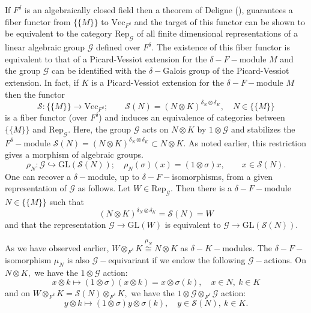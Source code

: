 \documentclass[preprint, 11pt]{amsart}
\theoremstyle{corollary}
\theoremstyle{remark}
\theoremstyle{proposition}
\numberwithin{equation}{subsection}
\begin{document}
If $F^{\delta}$ is an algebraically closed field then a theorem of Deligne (\cite[Section 9]{Del90}), guarantees a fiber functor from $\{\{M\}\}$ to $\mathrm{Vec}_{F^{\delta}}$ and the target of this functor can be shown to be equivalent to the category $\mathrm{Rep}_\mathscr G$ of all finite dimensional representations of a linear algebraic group $\mathscr G$ defined over $F^{\delta}.$ The existence of this fiber functor is equivalent to that of a Picard-Vessiot extension for the $\delta-F-$module $M$ and the group $\mathscr G$ can be identified with the $\delta-$Galois group of the Picard-Vessiot extension.  In fact, if $K$ is a  Picard-Vessiot extension  for the $\delta-F-$module $M$ then the functor $$\mathscr S: \{\{M\}\}\to \mathrm{Vec}_{F^{\delta}};\qquad \mathscr S(N)=(N\otimes K)^{\delta_N\otimes \delta_K}, \quad N\in \{\{M\}\}$$ is a fiber functor (over $F^{\delta}$) and induces an equivalence of categories between $\{\{M\}\}$ and  $\mathrm{Rep}_\mathscr G.$  Here, the group $\mathscr G$ acts on $N\otimes K$ by $1\otimes \mathscr G$ and  stabilizes the $F^{\delta}-$module  $\mathscr S(N)=(N\otimes K)^{\delta_N\otimes \delta_K}\subset N\otimes K.$  As noted earlier,  this restriction gives a morphism of algebraic groups. 
  \begin{equation*}\label{groupaction} \rho_N: \mathscr{G}\hookrightarrow\mathrm{GL}(\mathscr S (N));\quad  \rho_N(\sigma)(x)=(1\otimes\sigma)x,
	\qquad x\in \mathscr S(N).\end{equation*} 
 One can recover a $\delta-$module, up to $\delta-F-$isomorphisms,  from a given representation of $\mathscr{G}$ as follows. Let $W\in \mathrm{Rep}_\mathscr G.$ Then there is a $\delta-F-$module $N\in \{\{M\}\}$ such that $$(N\otimes K)^{\delta_N\otimes\delta_K}=\mathscr S(N)=W$$ and that the representation $\mathscr G\to \mathrm{GL}(W)$ is equivalent to $\mathscr G\to \mathrm{GL}(\mathscr S(N)).$

As we have observed earlier, $W\otimes_{F^{\delta}} K \overset{\mu_N}{\cong} N\otimes K$ as  $\delta-K-$modules.  The $\delta-F-$isomorphism $\mu_N$ is also $\mathscr{G}-$equivariant if we endow the following $\mathscr G-$actions. On $N\otimes K,$ we have the $1\otimes \mathscr G$ action:  \begin{equation}\label{actiononsinglecoordinate}x\otimes k\mapsto (1\otimes \sigma)(x\otimes k)=x\otimes \sigma(k), \quad x\in N, \ k\in K\end{equation} and on $W\otimes_{F^{\delta}} K=\mathscr S(N)\otimes_{F^\delta} K,$ we have the $1\otimes \mathscr G\otimes_{F^\delta} \mathscr G$ action: \begin{equation}\label{actiononbothcoordinates}y\otimes k\mapsto (1\otimes \sigma)y \otimes \sigma(k), \quad y\in \mathscr S(N), \ k\in K.\end{equation}
\end{document}
